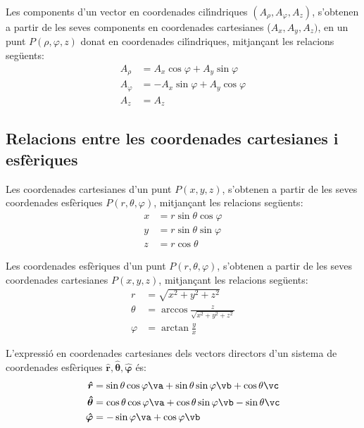 \documentclass[catalan,a4paper,twoside,11pt]{article}
\begin{document}
Les components d'un vector en coordenades cil\'{\i}ndriques $(A_\rho, A_\varphi, A_z)$, s'obtenen a partir de les seves components en coordenades cartesianes ($A_x, A_y, A_z)$, en un punt $P(\rho,\varphi,z)$ donat en coordenades cil\'{\i}ndriques, mitjan\c{c}ant les relacions seg\"{u}ents:
\begin{subequations}\begin{align}
    A_\rho &=  A_x\cos\varphi+A_y\sin\varphi\\
    A_\varphi &= -A_x\sin\varphi+A_y\cos\varphi \\
    A_z &= A_z
\end{align}\end{subequations}


\subsection{Relacions entre les coordenades cartesianes i
esf\`{e}riques}

Les coordenades cartesianes  d'un punt $P(x,y,z)$, s'obtenen a partir
de les seves coordenades esf\`{e}riques $P(r,\theta,\varphi)$,
mitjan\c{c}ant les relacions seg\"{u}ents:
\begin{subequations}\begin{align}
    x &=r\sin\theta\cos\varphi \\ y &=r\sin\theta\sin\varphi \\ z &=r\cos\theta
\end{align}\end{subequations}

Les coordenades  esf\`{e}riques  d'un punt $P(r,\theta,\varphi)$,
s'obtenen a partir de les seves coordenades cartesianes $P(x,y,z)$,
mitjan\c{c}ant les relacions seg\"{u}ents:
\begin{subequations}\begin{align}
    r &=\sqrt{x^2+y^2+z^2}\\
    \theta&=\arccos\frac{z}{\sqrt{x^2+y^2+z^2}}\\
    \varphi &=\arctan\frac{y}{x}
\end{align}\end{subequations}


L'expressi\'{o} en coordenades cartesianes dels vectors directors d'un sistema de coordenades  esf\`{e}riques $\boldsymbol{\hat{r}},\boldsymbol{\hat{\theta}},\boldsymbol{\hat{\varphi}}$ \'{e}s:
\begin{subequations}\begin{align}
    \boldsymbol{\hat{r}} &=\sin\theta\cos\varphi\va+ \sin\theta\sin\varphi\vb+\cos\theta\vc\\
    \boldsymbol{\hat{\theta}} &=\cos\theta\cos\varphi\va+
    \cos\theta\sin\varphi\vb-\sin\theta\vc\\
    \boldsymbol{\hat{\varphi}}&=-\sin\varphi\va+\cos\varphi\vb
\end{align}\end{subequations}
\end{document}

